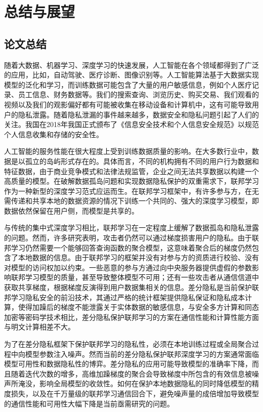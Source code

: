 \chapter{总结与展望}
\label{ch6}
\section{论文总结}
随着大数据、机器学习、深度学习的快速发展，人工智能在各个领域都得到了广泛的应用，比如，自动驾驶、医疗诊断、图像识别等。人工智能算法基于大数据实现模型的泛化和学习，而训练数据可能包含了大量的用户敏感信息，例如个人医疗记录、员工信息、财务数据等。我们的搜索查询、浏览历史、购买交易、我们观看的视频以及我们的观影偏好都有可能被收集在移动设备和计算机中，这有可能导致用户的隐私泄露。随着隐私泄漏的事件越来越多，数据安全和隐私问题引起了人们的关注。我国在2018年我国正式颁布了《信息安全技术和个人信息安全规范》以规范个人信息收集和存储的安全性。

人工智能的服务性能在很大程度上受到训练数据质量的影响。在大多数行业中，数据是以孤立的岛屿形式存在的。具体而言，不同的机构拥有不同的用户行为数据和特征数据，由于商业竞争模式和法律法规监管，企业之间无法共享数据以构建一个高质量的模型。在破解数据孤岛问题和实现数据隐私保护的双重需求下，联邦学习作为一种新型的深度学习范式应运而生。在联邦学习框架中，有许多参与方，在无需传递和共享本地的数据资源的情况下训练一个共同的、强大的深度学习模型，即数据依然保留在用户侧，而模型是共享的。

与传统的集中式深度学习相比，联邦学习在一定程度上缓解了数据孤岛和隐私泄露的问题。然而，许多研究表明，攻击者仍然可以通过梯度损害用户的隐私。由于联邦学习仍然需要一个能够回答查询函数的聚合模型，这意味着聚合后的梯度仍然包含了本地数据的信息。由于联邦学习的框架并没有对参与方的资质进行校验、没有对模型的访问权加以约束。一些恶意的参与方通过向中央服务器提供虚假的参数影响联邦学习模型的质量，甚至导致整体模型不可用；还有一些攻击者从通信信道中获取共享梯度，根据梯度反演得到用户数据集相关的信息。差分隐私是当前保护联邦学习隐私安全的前沿技术，其通过严格的统计框架提供隐私保证和隐私成本计算，使得加躁后的梯度不能泄露关于实体数据的敏感信息，与安全多方计算和同态加密等密码学技术相比，差分隐私保护联邦学习的方案在通信性能和计算性能方面与明文计算相差不大。

为了在差分隐私框架下保护联邦学习的隐私性，必须在本地训练过程或全局聚合过程中向模型参数注入噪声。然而当前的差分隐私保护联邦深度学习的方案通常面临模型可用性和数据隐私性的博弈。差分隐私的应用可能导致模型的准确率下降，而且随着迭代次数的增多，高维加躁梯度的聚合会导致梯度中所包含的有效信息被噪声所淹没，影响全局模型的收敛性。如何在保护本地数据隐私的同时降低模型的精度损失，以及在千万量级的联邦学习通信回合下，避免噪声量的成倍增加导致模型的通信性能和可用性大幅下降是当前亟需研究的问题。


